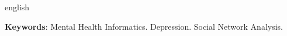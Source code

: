 \begin{resumo}[Abstract]
 \begin{otherlanguage*}{english}

   \vspace{\onelineskip}
 
   \noindent 
   \textbf{Keywords}: Mental Health Informatics. Depression. Social Network Analysis.
 \end{otherlanguage*}
\end{resumo}